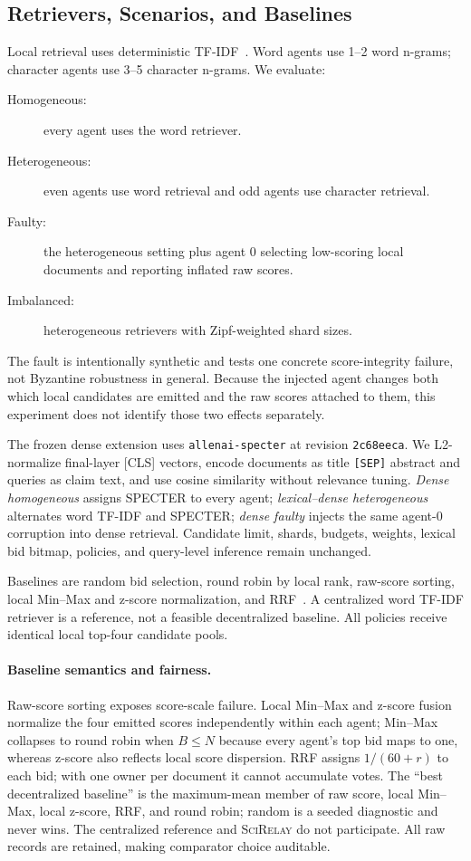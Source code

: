 \documentclass[sigconf]{acmart}
\newcommand{\method}{\textsc{SciRelay}}
\begin{document}
\subsection{Retrievers, Scenarios, and Baselines}

Local retrieval uses deterministic TF-IDF~\cite{salton1988term}. Word agents use 1--2 word n-grams; character agents use 3--5 character n-grams. We evaluate:
\begin{description}
  \item[Homogeneous:] every agent uses the word retriever.
  \item[Heterogeneous:] even agents use word retrieval and odd agents use character retrieval.
  \item[Faulty:] the heterogeneous setting plus agent 0 selecting low-scoring local documents and reporting inflated raw scores.
  \item[Imbalanced:] heterogeneous retrievers with Zipf-weighted shard sizes.
\end{description}
The fault is intentionally synthetic and tests one concrete score-integrity failure, not Byzantine robustness in general. Because the injected agent changes both which local candidates are emitted and the raw scores attached to them, this experiment does not identify those two effects separately.

The frozen dense extension uses \texttt{allenai-specter} at revision \texttt{2c68eeca}. We L2-normalize final-layer [CLS] vectors, encode documents as title \texttt{[SEP]} abstract and queries as claim text, and use cosine similarity without relevance tuning. \emph{Dense homogeneous} assigns SPECTER to every agent; \emph{lexical--dense heterogeneous} alternates word TF-IDF and SPECTER; \emph{dense faulty} injects the same agent-0 corruption into dense retrieval. Candidate limit, shards, budgets, weights, lexical bid bitmap, policies, and query-level inference remain unchanged.

Baselines are random bid selection, round robin by local rank, raw-score sorting, local Min--Max and z-score normalization, and RRF~\cite{cormack2009rrf}. A centralized word TF-IDF retriever is a reference, not a feasible decentralized baseline. All policies receive identical local top-four candidate pools.

\paragraph{Baseline semantics and fairness.}
Raw-score sorting exposes score-scale failure. Local Min--Max and z-score fusion normalize the four emitted scores independently within each agent; Min--Max collapses to round robin when $B\leq N$ because every agent's top bid maps to one, whereas z-score also reflects local score dispersion. RRF assigns $1/(60+r)$ to each bid; with one owner per document it cannot accumulate votes. The ``best decentralized baseline'' is the maximum-mean member of raw score, local Min--Max, local z-score, RRF, and round robin; random is a seeded diagnostic and never wins. The centralized reference and \method{} do not participate. All raw records are retained, making comparator choice auditable.
\end{document}
